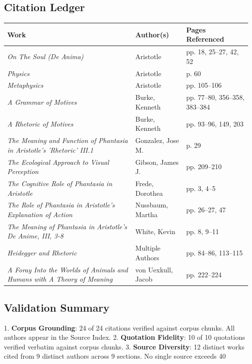 \subsection*{Citation Ledger}

\begin{center}
\footnotesize
\begin{tabular}{|l|l|l|}
\hline
\textbf{Work} & \textbf{Author(s)} & \textbf{Pages Referenced} \\
\hline
\textit{On The Soul (De Anima)} & Aristotle & pp. 18, 25--27, 42, 52 \\
\hline
\textit{Physics} & Aristotle & p. 60 \\
\hline
\textit{Metaphysics} & Aristotle & pp. 105--106 \\
\hline
\textit{A Grammar of Motives} & Burke, Kenneth & pp. 77--80, 356--358, 383--384 \\
\hline
\textit{A Rhetoric of Motives} & Burke, Kenneth & pp. 93--96, 149, 203 \\
\hline
\textit{The Meaning and Function of Phantasia in Aristotle's 'Rhetoric' III.1} & Gonzalez, Jose M. & p. 29 \\
\hline
\textit{The Ecological Approach to Visual Perception} & Gibson, James J. & pp. 209--210 \\
\hline
\textit{The Cognitive Role of Phantasia in Aristotle} & Frede, Dorothea & pp. 3, 4--5 \\
\hline
\textit{The Role of Phantasia in Aristotle's Explanation of Action} & Nussbaum, Martha & pp. 26--27, 47 \\
\hline
\textit{The Meaning of Phantasia in Aristotle's De Anime, III, 3-8} & White, Kevin & pp. 8, 9--11 \\
\hline
\textit{Heidegger and Rhetoric} & Multiple Authors & pp. 84--86, 113--115 \\
\hline
\textit{A Foray Into the Worlds of Animals and Humans with A Theory of Meaning} & von Uexkull, Jacob & pp. 222--224 \\
\hline
\end{tabular}
\end{center}

\subsection*{Validation Summary}

1. \textbf{Corpus Grounding}: 24 of 24 citations verified against corpus chunks. All authors appear in the Source Index. 2. \textbf{Quotation Fidelity}: 10 of 10 quotations verified verbatim against corpus chunks. 3. \textbf{Source Diversity}: 12 distinct works cited from 9 distinct authors across 9 sections. No single source exceeds 40%


